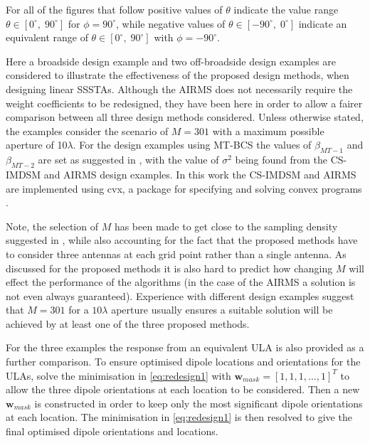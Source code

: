 \documentclass[10pt,final]{IEEEtran}
\begin{document}
For all of the figures that follow positive values of $\theta$
indicate the value range $\theta\in[0^\circ,\; 90^\circ]$ for
$\phi=90^{\circ}$, while negative values of $\theta\in[-90^\circ,\;
0^\circ]$ indicate an equivalent range of $\theta\in[0^\circ,\;
90^\circ]$ with $\phi=-90^{\circ}$.

  Here a broadside design example and two off-broadside design examples are considered to illustrate the effectiveness of the proposed design methods, when designing linear SSSTAs.  Although the AIRMS does not necessarily require the weight coefficients to be redesigned, they have been here in order to allow a fairer comparison between all three design methods considered.  Unless otherwise stated,
the examples consider the scenario of $M=301$ with a maximum possible aperture of 10$\lambda$.  For the design examples using MT-BCS the values of $\beta_{MT-1}$ and $\beta_{MT-2}$ are set as suggested in \cite{Ji09}, with the value of $\sigma^{2}$ being found from the CS-IMDSM and AIRMS design examples.  In this work the CS-IMDSM and AIRMS are implemented using cvx, a package for specifying and solving convex programs \cite{cvx,Grant08}.

Note, the selection of $M$ has been made to get close to the sampling density suggested in \cite{Fuchs12}, while also accounting for the fact that the proposed methods have to consider three antennas at each grid point rather than a single antenna.  As discussed for the proposed methods it is also hard to predict how changing $M$ will effect the performance of the algorithms (in the case of the AIRMS a solution is not even always guaranteed).  Experience with different design examples suggest that $M=301$ for a $10\lambda$ aperture usually ensures a suitable solution will be achieved by at least one of the three proposed methods.


For the three examples the response from an equivalent ULA is also provided as a further comparison.  To ensure
optimised dipole locations and orientations for the ULAs, solve the minimisation in \eqref{eq:redesign1}
with $\textbf{w}_{mask}=[1, 1, 1, \ldots, 1]^{T}$ to allow the three dipole orientations at each location to
be considered.  Then a new $\textbf{w}_{mask}$ is constructed in order to keep only the most significant
dipole orientations at each location.  The minimisation in \eqref{eq:redesign1} is then resolved to give the
final optimised dipole orientations and locations.
\end{document}
